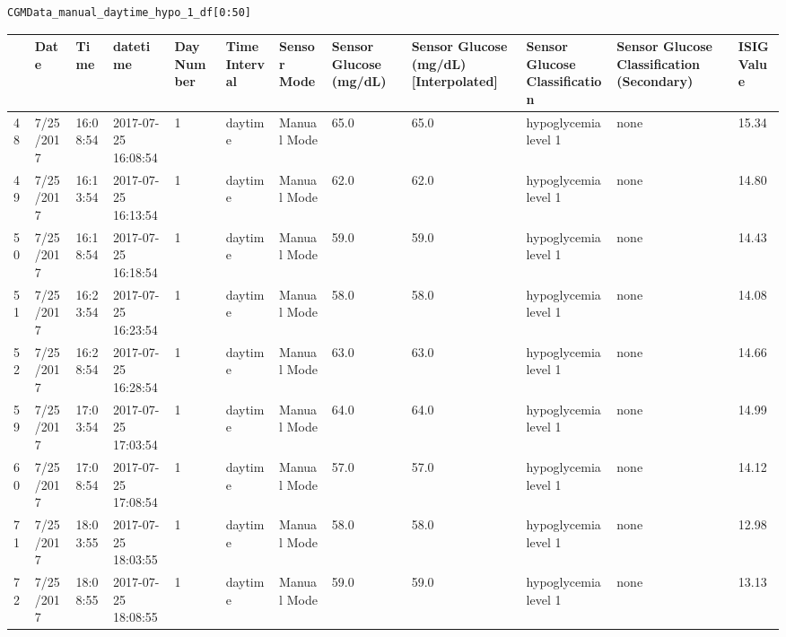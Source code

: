 \bigskip

\begin{verbatim}
CGMData_manual_daytime_hypo_1_df[0:50]
\end{verbatim}

\bigskip\noindent
\begin{tabular}{p{}p{}p{}p{}p{}p{}p{}p{}p{}p{}p{}p{}}
\toprule
 & Date & Time & datetime & Day Number & Time Interval & Sensor Mode & Sensor Glucose (mg/dL) & Sensor Glucose (mg/dL) [Interpolated] & Sensor Glucose Classification & Sensor Glucose Classification (Secondary) & ISIG Value \\
\hline
48 & 7/25/2017 & 16:08:54 & 2017-07-25 16:08:54 & 1 & daytime & Manual Mode & 65.0 & 65.0 & hypoglycemia level 1 & none & 15.34 \\
\hline
49 & 7/25/2017 & 16:13:54 & 2017-07-25 16:13:54 & 1 & daytime & Manual Mode & 62.0 & 62.0 & hypoglycemia level 1 & none & 14.80 \\
\hline
50 & 7/25/2017 & 16:18:54 & 2017-07-25 16:18:54 & 1 & daytime & Manual Mode & 59.0 & 59.0 & hypoglycemia level 1 & none & 14.43 \\
\hline
51 & 7/25/2017 & 16:23:54 & 2017-07-25 16:23:54 & 1 & daytime & Manual Mode & 58.0 & 58.0 & hypoglycemia level 1 & none & 14.08 \\
\hline
52 & 7/25/2017 & 16:28:54 & 2017-07-25 16:28:54 & 1 & daytime & Manual Mode & 63.0 & 63.0 & hypoglycemia level 1 & none & 14.66 \\
\hline
59 & 7/25/2017 & 17:03:54 & 2017-07-25 17:03:54 & 1 & daytime & Manual Mode & 64.0 & 64.0 & hypoglycemia level 1 & none & 14.99 \\
\hline
60 & 7/25/2017 & 17:08:54 & 2017-07-25 17:08:54 & 1 & daytime & Manual Mode & 57.0 & 57.0 & hypoglycemia level 1 & none & 14.12 \\
\hline
71 & 7/25/2017 & 18:03:55 & 2017-07-25 18:03:55 & 1 & daytime & Manual Mode & 58.0 & 58.0 & hypoglycemia level 1 & none & 12.98 \\
\hline
72 & 7/25/2017 & 18:08:55 & 2017-07-25 18:08:55 & 1 & daytime & Manual Mode & 59.0 & 59.0 & hypoglycemia level 1 & none & 13.13 \\

\end{tabular}
